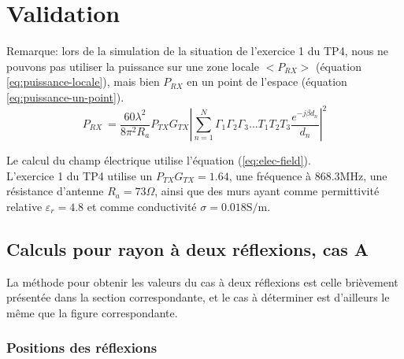 \chapter{Validation}
\label{chapter-3}





Remarque: lors de la simulation de la situation de l'exercice 1 du TP4, nous ne pouvons pas utiliser la puissance sur une zone locale $<P_{RX}>$ (équation \ref{eq:puissance-locale}), mais bien $P_{RX}$ en un point de l'espace (équation \ref{eq:puissance-un-point}).
\begin{equation}
    \label{eq:puissance-un-point}
    P_{RX}\ = \frac{60 \lambda^2}{8 \pi^2 R_a}P_{TX}G_{TX} \left| \sum_{n=1}^N \Gamma_1 \Gamma_2 \Gamma_3 \dotsc T_1 T_2 T_3 \frac{e^{-j \beta d_n}}{d_n} \right|^2
\end{equation}

Le calcul du champ électrique utilise l'équation (\ref{eq:elec-field}).\\

L'exercice 1 du TP4 utilise un $P_{TX}G_{TX}=1.64$, une fréquence à $868.3 \mathrm{MHz}$, une résistance d'antenne $R_a=73 \Omega$, ainsi que des murs ayant comme permittivité relative $\varepsilon_r=4.8$ et comme conductivité $\sigma=0.018 \mathrm{S/m}$.

\section{Calculs pour rayon à deux réflexions, cas A}
La m{\'e}thode pour obtenir les valeurs du cas {\`a} deux r{\'e}flexions est
celle bri{\`e}vement pr{\'e}sent{\'e}e dans la section correspondante, et le
cas {\`a} d{\'e}terminer est d'ailleurs le m{\^e}me que la figure
correspondante.

\subsection{Positions des r{\'e}flexions}

